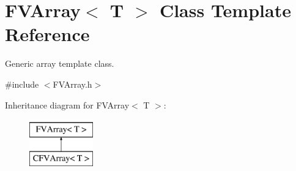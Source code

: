 \hypertarget{classFVL_1_1FVArray}{
\section{FVArray$<$ T $>$ Class Template Reference}
\label{d0/d1a/classFVL_1_1FVArray}
}


Generic array template class.  




{\ttfamily \#include $<$FVArray.h$>$}

Inheritance diagram for FVArray$<$ T $>$:\begin{figure}[H]
\begin{center}
\leavevmode
\includegraphics[height=2.000000cm]{d0/d1a/classFVL_1_1FVArray}
\end{center}
\end{figure}
